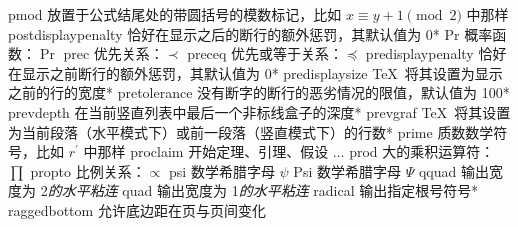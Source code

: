 \capcs pmod {放置于公式结尾处的带圆括号的模数标记，比如 $x \equiv y+1 \pmod 2$ 中那样}{}{}
\capcs postdisplaypenalty {恰好在显示之后的断行的额外惩罚，其默认值为 0}*{}
\capcs Pr {概率函数：$\Pr$}{}{}
\capcs prec {优先关系：$\prec$}{}{}
\capcs preceq {优先或等于关系：$\preceq$}{}{}
\capcs predisplaypenalty {恰好在显示之前断行的额外惩罚，其默认值为 0}*{}
\capcs predisplaysize {\TeX\ 将其设置为显示之前的行的宽度}*{}
\capcs pretolerance {没有断字的断行的恶劣情况的限值，默认值为 100}*{}
\capcs prevdepth {在当前竖直列表中最后一个非标线盒子的深度}*{}
\capcs prevgraf {\TeX\ 将其设置为当前段落（水平模式下）或前一段落（竖直模式下）的行数}*{}
\capcs prime {质数数学符号，比如 $r^\prime$ 中那样}{}{}
\capcs proclaim {开始定理、引理、假设 $\ldots$}{}{\@proclaim}
\capcs prod {大的乘积运算符：$\prod$}{}{}
\capcs propto {比例关系：$\propto$}{}{}
\capcs psi {数学希腊字母 $\psi$}{}{}
\capcs Psi {数学希腊字母 $\Psi$}{}{}
\capcs qquad {输出宽度为 2\em 的水平粘连}{}{}
\capcs quad {输出宽度为 1\em 的水平粘连}{}{}
\capcs radical {输出指定根号符号}*{}
\capcs raggedbottom {允许底边距在页与页间变化}{}{}
